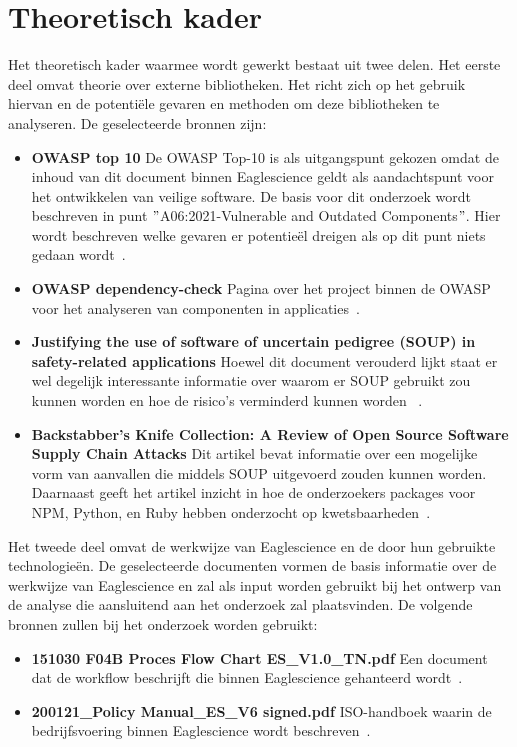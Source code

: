 \section{Theoretisch kader}\label{sec:theoretisch-kader}
Het theoretisch kader waarmee wordt gewerkt bestaat uit twee delen. Het eerste deel omvat theorie over externe bibliotheken. Het richt zich op het gebruik hiervan en de potentiële gevaren en methoden om deze bibliotheken te analyseren. De geselecteerde bronnen zijn:
\begin{itemize}
    \item \textbf{OWASP top 10}
    De OWASP Top-10 is als uitgangspunt gekozen omdat de inhoud van dit document binnen Eaglescience geldt als aandachtspunt voor het ontwikkelen van veilige software. De basis voor dit onderzoek wordt beschreven in punt $"$A06:2021-Vulnerable and Outdated Components$"$. Hier wordt beschreven welke gevaren er potentieël dreigen als op dit punt niets gedaan wordt~\citep{OWASP:2021}.
    \item \textbf{OWASP dependency-check} Pagina over het project binnen de OWASP voor het analyseren van componenten in applicaties~\citep{OWASP:2017}.
    \item \textbf{Justifying the use of software of uncertain pedigree (SOUP) in safety-related applications} Hoewel dit document verouderd lijkt staat er wel degelijk interessante informatie over waarom er SOUP gebruikt zou kunnen worden en hoe de risico's verminderd kunnen worden~\citep{Bischop:2001} .
    \item \textbf{Backstabber’s Knife Collection: A Review of Open Source Software Supply Chain Attacks} Dit artikel bevat informatie over een mogelijke vorm van aanvallen die middels SOUP uitgevoerd zouden kunnen worden. Daarnaast geeft het artikel inzicht in hoe de onderzoekers packages voor NPM, Python, en Ruby hebben onderzocht op kwetsbaarheden~\citep{Ohm:2020}.
\end{itemize}
Het tweede deel omvat de werkwijze van Eaglescience en de door hun gebruikte technologieën. De geselecteerde documenten vormen de basis informatie over de werkwijze van Eaglescience en zal als input worden gebruikt bij het ontwerp van de analyse die aansluitend aan het onderzoek zal plaatsvinden. De volgende bronnen zullen bij het onderzoek worden gebruikt:
\begin{itemize}
    \item \textbf{151030 F04B Proces Flow Chart ES\_V1.0\_TN.pdf} Een document dat de workflow beschrijft die binnen Eaglescience gehanteerd wordt~\citep{Eaglescience:2015}.
    \item \textbf{200121\_Policy Manual\_ES\_V6 signed.pdf} ISO-handboek waarin de bedrijfsvoering binnen Eaglescience wordt beschreven~\citep{Eaglescience:2020}.
\end{itemize}

